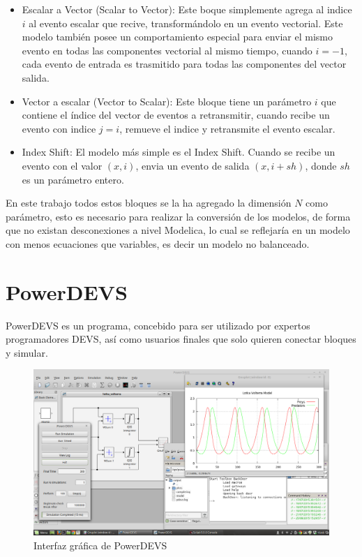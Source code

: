 	\begin{itemize}
		\item Escalar a Vector (Scalar to Vector): Este boque simplemente agrega al indice $i$ al evento escalar que recive, transformándolo en un 
			evento vectorial. Este modelo también posee un comportamiento especial para enviar el mismo evento en todas las componentes vectorial 
			al mismo tiempo, cuando $i = -1$, cada evento de entrada es trasmitido para todas las componentes del vector salida.
		\item Vector a escalar (Vector to Scalar): Este bloque tiene un parámetro $i$ que contiene el índice del vector de eventos a retransmitir, 
			cuando recibe un evento con indice $j=i$, remueve el indice y retransmite el evento escalar.
		\item Index Shift: El modelo más simple es el Index Shift. Cuando se recibe un evento con el valor $(x,i)$, envia un evento de salida $(x, i+sh)$, 
			donde $sh$ es un parámetro entero.
	\end{itemize}

	En este trabajo todos estos bloques se la ha agregado la dimensión $N$ como parámetro, esto es necesario para realizar la conversión de los modelos,
	 de forma que no existan desconexiones a nivel Modelica, lo cual se reflejaría en un modelo con menos ecuaciones que variables, es decir un modelo 
	no balanceado.
	 
\section{PowerDEVS}
	PowerDEVS es un programa, concebido para ser utilizado por expertos programadores DEVS, así como usuarios finales que solo quieren conectar bloques y simular.

	\begin{figure}[!htbp]
	  \includegraphics[width=\textwidth]{powerdevs}
	  \caption{Interfaz gráfica de PowerDEVS}
	   \label{fig:powerdevsgui}
	\end{figure}

